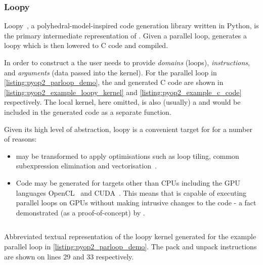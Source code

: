 \documentclass[thesis]{subfiles}
\begin{document}
\subsubsection{Loopy}

Loopy~\cite{klocknerLooPyTransformationbased2014}, a polyhedral-model-inspired code generation library written in Python, is the primary intermediate representation of .
Given a parallel loop,  generates a loopy  which is then lowered to C code and compiled.

In order to construct a  the user needs to provide \emph{domains} (loops), \emph{instructions}, and \emph{arguments} (data passed into the kernel).
For the parallel loop in \cref{listing:pyop2_parloop_demo}, the  and generated C code are shown in \cref{listing:pyop2_example_loopy_kernel} and \cref{listing:pyop2_example_c_code} respectively.
The local kernel, here omitted, is also (usually) a  and would be included in the generated code as a separate function.

Given its high level of abstraction, loopy is a convenient target for  for a number of reasons:
\begin{itemize}
  \item
     may be transformed to apply optimisations such as loop tiling, common subexpression elimination and vectorisation~\cite{klocknerLooPyFortran2015,klocknerArrayProgramTransformation2016,sunStudyVectorizationMatrixfree2020}.
  \item
    Code may be generated for targets other than CPUs including the GPU languages OpenCL~\cite{stoneOpenCLParallelProgramming2010a} and CUDA~\cite{CUDAProgrammingGuide}.
    This means that  is capable of executing parallel loops on GPUs without making intrusive changes to the code - a fact demonstrated (as a proof-of-concept) by \cite{fenics2021-kulkarni}.
\end{itemize}

\begin{listing}
  \centering
  \begin{minipage}{.9\textwidth}
    \inputminted[linenos]{text}{./scripts/artefacts/pyop2_example_loopy_kernel_tidy.txt}
  \end{minipage}
  \caption{
    Abbreviated textual representation of the loopy kernel generated for the example parallel loop in \cref{listing:pyop2_parloop_demo}.
    The pack and unpack instructions are shown on lines 29 and 33 respectively.
  }
  \label{listing:pyop2_example_loopy_kernel}
\end{listing}
\end{document}
